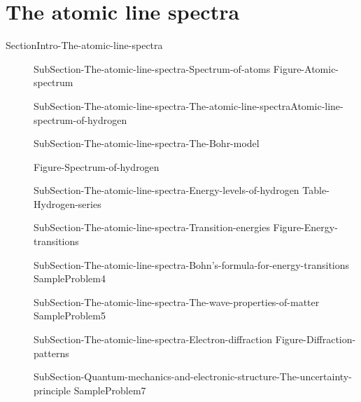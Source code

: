\documentclass[main.tex]{subfiles}
\begin{document}
\section{The atomic line spectra}
{SectionIntro-The-atomic-line-spectra}
\sloppy
\begin{description}
\item[]{SubSection-The-atomic-line-spectra-Spectrum-of-atoms}
{Figure-Atomic-spectrum}
\item[]{SubSection-The-atomic-line-spectra-The-atomic-line-spectraAtomic-line-spectrum-of-hydrogen}
\item[]{SubSection-The-atomic-line-spectra-The-Bohr-model}

  {Figure-Spectrum-of-hydrogen}
\item[]{SubSection-The-atomic-line-spectra-Energy-levels-of-hydrogen}
\vspace{-0.5cm}{Figure-Energy-levels-of-hydrogen}
{Table-Hydrogen-series}

\item[]{SubSection-The-atomic-line-spectra-Transition-energies}
{Figure-Energy-transitions}
 \item[]{SubSection-The-atomic-line-spectra-Bohn's-formula-for-energy-transitions}
  {SampleProblem4}
\newpage\vspace{5cm}{Figure-Debroglie}
 \item[]{SubSection-The-atomic-line-spectra-The-wave-properties-of-matter}
  {SampleProblem5}
 \item[]{SubSection-The-atomic-line-spectra-Electron-diffraction}
 {Figure-Diffraction-patterns}
 \item[] {SubSection-Quantum-mechanics-and-electronic-structure-The-uncertainty-principle}
  {SampleProblem7}
\end{description}
\newpage
\end{document}
